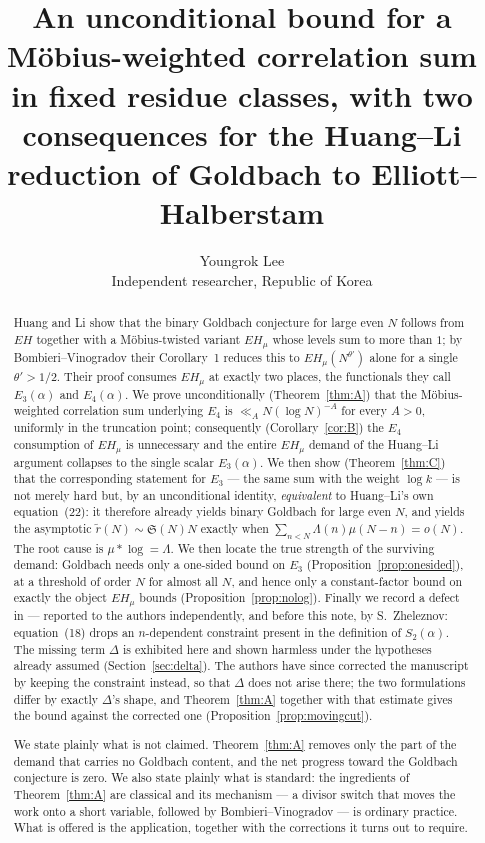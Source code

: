 \documentclass[11pt,a4paper]{article}
\title{An unconditional bound for a M\"obius-weighted correlation sum
in fixed residue classes, with two consequences for the Huang--Li
reduction of Goldbach to Elliott--Halberstam}
\author{Youngrok Lee\\
\small Independent researcher, Republic of Korea}
\date{}
\theoremstyle{plain}
\theoremstyle{definition}
\theoremstyle{remark}
\renewcommand{\SS}{\mathfrak{S}}
\begin{document}
\maketitle

\begin{abstract}
Huang and Li \cite{HL} show that the binary Goldbach conjecture for
large even $N$ follows from $EH$ together with a M\"obius-twisted
variant $EH_\mu$ whose levels sum to more than $1$; by
Bombieri--Vinogradov their Corollary~1 reduces this to
$EH_\mu(N^{\theta'})$ alone for a single $\theta'>1/2$. Their proof
consumes $EH_\mu$ at exactly two places, the functionals they call
$E_3(\alpha)$ and $E_4(\alpha)$. We prove unconditionally
(Theorem~\ref{thm:A}) that the M\"obius-weighted correlation sum
underlying $E_4$ is $\ll_A N(\log N)^{-A}$ for every $A>0$, uniformly
in the truncation point; consequently (Corollary~\ref{cor:B}) the
$E_4$ consumption of $EH_\mu$ is unnecessary and the entire $EH_\mu$
demand of the Huang--Li argument collapses to the single scalar
$E_3(\alpha)$. We then show (Theorem~\ref{thm:C}) that the
corresponding statement for $E_3$ --- the same sum with the weight
$\log k$ --- is not merely hard but, by an unconditional identity,
\emph{equivalent} to Huang--Li's own equation~(22): it therefore
already yields binary Goldbach for large even $N$, and yields the
asymptotic $\tilde r(N)\sim\SS(N)N$ exactly when
$\sum_{n<N}\Lambda(n)\mu(N-n)=o(N)$. The root cause is
$\mu*\log=\Lambda$. We then locate the true strength of the surviving
demand: Goldbach needs only a one-sided bound on $E_3$
(Proposition~\ref{prop:onesided}), at a threshold of order $N$ for
almost all $N$, and hence only a constant-factor bound on exactly the
object $EH_\mu$ bounds (Proposition~\ref{prop:nolog}). Finally we
record a defect in \cite{HL} --- reported to the authors
independently, and before this note, by S.~Zheleznov: equation~(18)
drops an $n$-dependent constraint present in the definition of
$S_2(\alpha)$. The missing term $\Delta$ is exhibited here and shown
harmless under the hypotheses already assumed
(Section~\ref{sec:delta}). The authors have since corrected the
manuscript by keeping the constraint instead, so that $\Delta$ does not
arise there; the two formulations differ by exactly $\Delta$'s shape,
and Theorem~\ref{thm:A} together with that estimate gives the bound
against the corrected one (Proposition~\ref{prop:movingcut}).

We state plainly what is not claimed. Theorem~\ref{thm:A} removes only
the part of the demand that carries no Goldbach content, and the net
progress toward the Goldbach conjecture is zero. We also state plainly
what is standard: the ingredients of Theorem~\ref{thm:A} are classical
and its mechanism --- a divisor switch that moves the work onto a
short variable, followed by Bombieri--Vinogradov --- is ordinary
practice. What is offered is the application, together with the
corrections it turns out to require.
\end{abstract}
\end{document}
